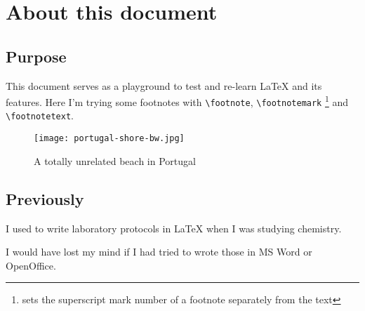 \documentclass[book.tex]{subfiles}
\begin{document}
\chapter{About this document}
\section{Purpose}

This document serves as a playground to test and re-learn\footnotemark{} \LaTeX{} and its features.
Here I'm trying some footnotes with \verb=\footnote=, \verb=\footnotemark=
\footnote{sets the superscript mark number of a footnote separately from the text}
and \verb=\footnotetext=\footnotemark.

\begin{figure}[h]
  \texttt{[image: portugal-shore-bw.jpg]}
  \caption{A totally unrelated beach in Portugal}
  \centering
\end{figure}

\section{Previously}

I used to write laboratory protocols in \LaTeX{} when I was studying chemistry.

I would have lost my mind if I had tried to wrote those in MS Word or OpenOffice.
\end{document}
